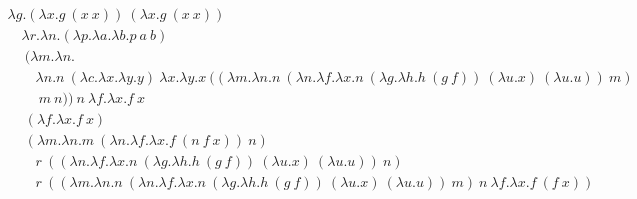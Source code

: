 \documentclass[11pt]{article}
\newcommand{\one}{\lambda f . \lambda x . f \ x}
\newcommand{\two}{\lambda f . \lambda x . f \ (f \ x)}
\newcommand{\tru}{\lambda x . \lambda y . x}
\newcommand{\flse}{\lambda x . \lambda y . y}
\newcommand{\isz}{\lambda n . n \ (\lambda c . \flse) \ \tru}
\newcommand{\ife}{\lambda p . \lambda a . \lambda b . p \ a \ b}
\newcommand{\suc}{\lambda n . \lambda f . \lambda x . f \ (n \ f \ x)}
\newcommand{\plus}{\lambda m . \lambda n . m \ (\suc) \ n}
\newcommand{\pred}{\lambda n . \lambda f . \lambda x . n \ (\lambda g . \lambda h . h \ (g \ f)) \ (\lambda u . x) \ (\lambda u . u)}
\newcommand{\sub}{\lambda m . \lambda n . n \ (\pred) \ m}
\newcommand{\lleq}{\lambda m . \lambda n . \\ \qquad \isz \ ((\sub) \\ \qquad \ m \ n)}
\newcommand{\fix}{\lambda g . (\lambda x . g \ (x \ x)) \ (\lambda x . g \ (x \ x))}
\newcommand{\appo}[2]{#1 \ #2}
\newcommand{\appt}[3]{#1 \ #2 \ #3}
\begin{document}
\begin{gather*}
  \fix \\                                   %
  \quad \lambda r . \lambda n . (\ife) \\   %
  \quad \ \appt{(\lleq)}{n}{\one} \\        %
  \quad \ (\one) \\                         %
  \quad \ (\plus) \\                        %
  \qquad \appo{r}{(\appo{(\pred)}{n})} \\   %
  \qquad \appo{r}{(\appt{(\sub)}{n}{\two})} %
\end{gather*}
\end{document}
